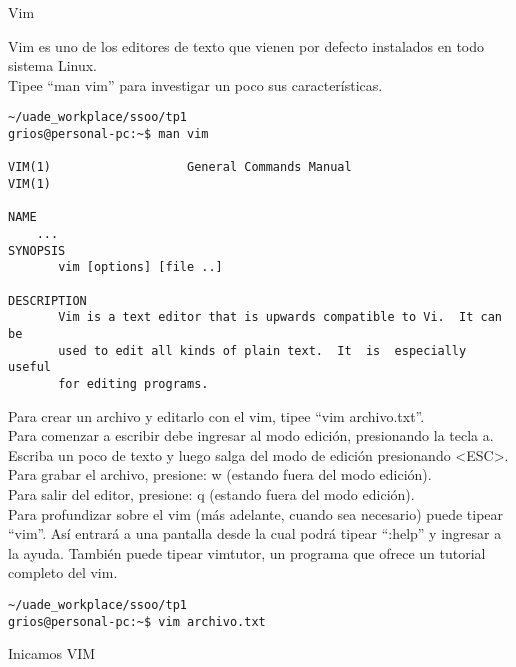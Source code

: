 \begin{section}{Vim}

\begin{quoting}
Vim es uno de los editores de texto que vienen por defecto instalados en todo sistema Linux.\\
Tipee “man vim” para investigar un poco sus características.\end{quoting}
\begin{lstlisting}[style=Ubuntu]
~/uade_workplace/ssoo/tp1
grios@personal-pc:~$ man vim

VIM(1)                   General Commands Manual                  VIM(1)

NAME
	...
SYNOPSIS
       vim [options] [file ..]

DESCRIPTION
       Vim is a text editor that is upwards compatible to Vi.  It can be
       used to edit all kinds of plain text.  It  is  especially  useful
       for editing programs.

\end{lstlisting}

\begin{quoting}
Para crear un archivo y editarlo con el vim, tipee “vim archivo.txt”. \\
Para comenzar a escribir debe ingresar al modo edición, presionando la tecla a. Escriba un poco de
texto y luego salga del modo de edición presionando <ESC>.\\
Para grabar el archivo, presione: w (estando fuera del modo edición).\\
Para salir del editor, presione: q (estando fuera del modo edición).\\
Para profundizar sobre el vim (más adelante, cuando sea necesario) puede tipear “vim”. Así entrará a
una pantalla desde la cual podrá tipear “:help” y ingresar a la ayuda. También puede tipear vimtutor, un
programa que ofrece un tutorial completo del vim.
\end{quoting}

\begin{lstlisting}[style=Ubuntu]
~/uade_workplace/ssoo/tp1
grios@personal-pc:~$ vim archivo.txt

\end{lstlisting}

Inicamos VIM
\begin{lstlisting}[style=Ubuntu]


\end{lstlisting}
\end{section}
